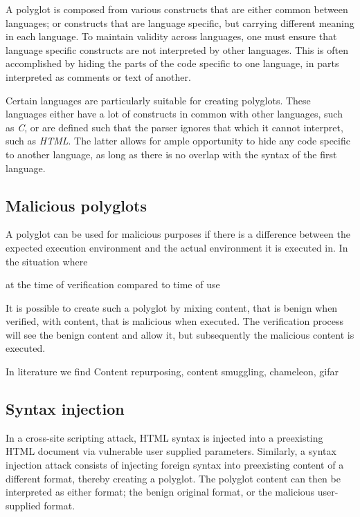 \documentclass[10pt, conference, compsocconf]{IEEEtran}
\begin{document}
A polyglot is composed from various constructs that are either 
common between languages; or constructs that are language specific, but carrying 
different meaning in each language. To maintain validity across languages, 
one must ensure that language specific constructs are not interpreted by 
other languages. This is often accomplished by hiding the parts of the 
code specific to one language, in parts interpreted as comments or text 
of another.

Certain languages are particularly suitable for creating polyglots. 
These languages either have a lot of constructs in common with other 
languages, such as \emph{C}, or are defined such that the parser 
ignores that which it cannot interpret, such as \emph{HTML}. The 
latter allows for ample opportunity to hide any code specific to 
another language, as long as there is no overlap with the syntax 
of the first language.


\subsection{Malicious polyglots}

A polyglot can be used for malicious purposes if there is a difference 
between the expected execution environment and the actual environment 
it is executed in.
In the situation where 

at the time of verification compared to time of use

It is possible to create such a polyglot by mixing content, that is benign 
when verified, with content, that is 
malicious when executed. The verification process will see the benign content 
and allow it, but subsequently the malicious content is executed.

In literature we find Content repurposing, content smuggling, chameleon, gifar

\subsection{Syntax injection}


In a cross-site scripting attack, HTML syntax is injected into a 
preexisting HTML document via vulnerable user supplied parameters. Similarly, 
a syntax injection attack consists of injecting foreign syntax into 
preexisting content of a different format, thereby creating a polyglot.
The polyglot content can then be interpreted as either format; the benign 
original format, or the malicious user-supplied format. 
\end{document}

